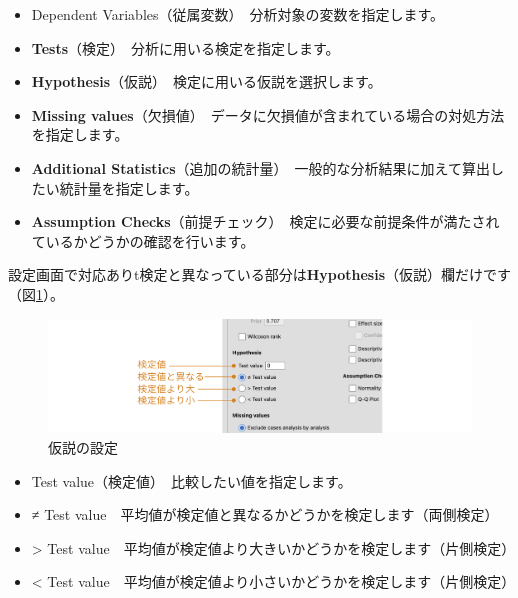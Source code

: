 \documentclass[
  12pt,
  a5jpaper,
  lualatex, ja=standard]{bxjsbook}
\providecommand{\tightlist}{%
  \setlength{\itemsep}{0pt}\setlength{\parskip}{0pt}}
\newenvironment{jmvsettings}{%
	\begin{center}%
	\begin{tcolorbox}[%
		title=設定項目,
		colframe=gmoji,
		colbacktitle=gmoji,
		colback=gmoji!2!white,
		breakable,
		width=.9\textwidth,
		]\small\addtolength{\leftmargini}{-3\labelsep}%
	}%
	{\end{tcolorbox}\end{center}}
\begin{document}
\begin{jmvsettings}

\begin{itemize}
\tightlist
\item
  Dependent Variables（従属変数）　分析対象の変数を指定します。
\item
  \textbf{Tests}（検定）　分析に用いる検定を指定します。
\item
  \textbf{Hypothesis}（仮説）　検定に用いる仮説を選択します。
\item
  \textbf{Missing values}（欠損値）　データに欠損値が含まれている場合の対処方法を指定します。
\item
  \textbf{Additional Statistics}（追加の統計量）　一般的な分析結果に加えて算出したい統計量を指定します。
\item
  \textbf{Assumption Checks}（前提チェック）　検定に必要な前提条件が満たされているかどうかの確認を行います。
\end{itemize}

\end{jmvsettings}

設定画面で対応ありt検定と異なっている部分は\textbf{Hypothesis}（仮説）欄だけです（図\ref{fig:ttests-one-hypothesis}）。

\begin{figure}[!ht]

{\centering \includegraphics[width=1\linewidth]{images/ttests/one-hypothesis} 

}

\caption{仮説の設定}\label{fig:ttests-one-hypothesis}
\end{figure}

\begin{jmvsettings}

\begin{itemize}
\tightlist
\item
  Test value（検定値）　比較したい値を指定します。
\item
  ≠ Test value　平均値が検定値と異なるかどうかを検定します（両側検定）
\item
  \textgreater{} Test value　平均値が検定値より大きいかどうかを検定します（片側検定）
\item
  \textless{} Test value　平均値が検定値より小さいかどうかを検定します（片側検定）
\end{itemize}

\end{jmvsettings}
\end{document}
